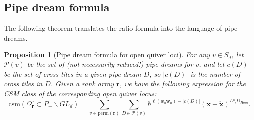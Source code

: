 \documentclass[reqno]{amsart}
\newcommand{\csm}{\textrm{csm}}
\newcommand{\perm}{\textrm{perm}}
\numberwithin{equation}{section}
\newtheorem{proposition}[theorem]{Proposition}
\theoremstyle{definition}
\theoremstyle{remark}
\begin{document}
\subsection{Pipe dream formula}\label{sec:csm-pd}
The following theorem translates the ratio formula into the language of pipe dreams.
\begin{proposition}[Pipe dream formula for open quiver loci]\label{prop:pdopen}
For any $v \in S_d$, let $\mathcal{P}(v)$ be the set of (not necessarily reduced!) pipe dreams for $v$, and let $c(D)$ be the set of cross tiles in a given pipe dream $D$, so $|c(D)|$ is the number of cross tiles in $D$.
Given a rank array $\mathbf{r}$, we have the following expression for the CSM class of the corresponding open quiver locus:
\[\csm(\Omega_{\mathbf{r}}^\circ \subset P_- \backslash GL_d) =
\sum_{v \in \perm(\mathbf{r})} 
\sum_{D \in \mathcal{P}(v)} \hbar^{\ell(w_0\mathbf{w}_0)-|c(D)|}(\mathbf{x}-\mathring{\mathbf{x}})^{D\setminus D_{Hom}}.\]
\end{proposition}
\end{document}
